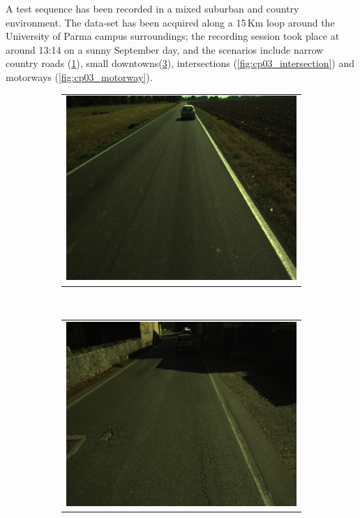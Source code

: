 A test sequence has been recorded in a mixed suburban and country environment. The data-set has been acquired along a 15\,Km loop around the University of Parma campus surroundings; the recording session took place at around 13:14 on a sunny September day, and the scenarios include narrow country roads (\ref{fig:cp03_countryRoad}), small downtowns(\ref{fig:cp03_downtown}), intersections (\ref{fig:cp03_intersection}) and motorways (\ref{fig:cp03_motorway}).

\begin{figure}[h!]
        \centering
        \begin{subfigure}[b]{0.45\textwidth}
	  \begin{tabular}{c}
	    \includegraphics[width=\textwidth]{countryRoad}
	  \end{tabular}
	  \caption{}\label{fig:cp03_countryRoad}
        \end{subfigure}%
        ~
        \begin{subfigure}[b]{0.45\textwidth}
	  \begin{tabular}{c}
	    \includegraphics[width=\textwidth]{downtown}
	  \end{tabular}
	  \caption{}\label{fig:cp03_downtown}
        \end{subfigure}%
        

\end{figure}
